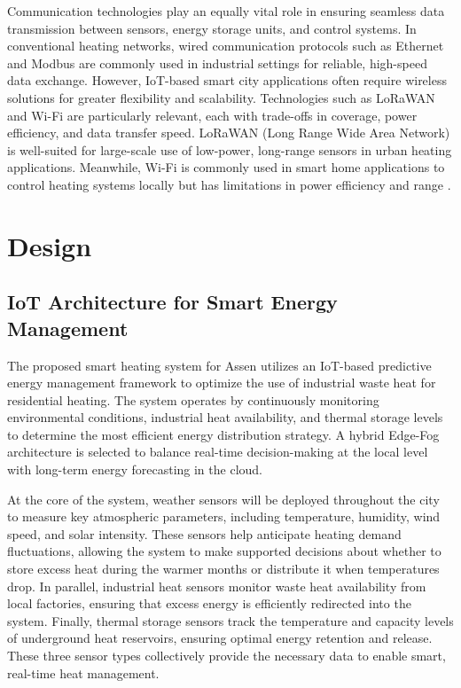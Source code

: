 \documentclass{article}
\begin{document}
Communication technologies play an equally vital role in ensuring seamless data transmission between sensors, energy storage units, and control systems. In conventional heating networks, wired communication protocols such as Ethernet and Modbus are commonly used in industrial settings for reliable, high-speed data exchange. However, IoT-based smart city applications often require wireless solutions for greater flexibility and scalability. Technologies such as LoRaWAN and Wi-Fi are particularly relevant, each with trade-offs in coverage, power efficiency, and data transfer speed. LoRaWAN (Long Range Wide Area Network) is well-suited for large-scale use of low-power, long-range sensors in urban heating applications. Meanwhile, Wi-Fi is commonly used in smart home applications to control heating systems locally but has limitations in power efficiency and range \cite{comm_tech_review}. 

\section{Design}

\subsection{IoT Architecture for Smart Energy Management}

The proposed smart heating system for Assen utilizes an IoT-based predictive energy management framework to optimize the use of industrial waste heat for residential heating. The system operates by continuously monitoring environmental conditions, industrial heat availability, and thermal storage levels to determine the most efficient energy distribution strategy. A hybrid Edge-Fog architecture is selected to balance real-time decision-making at the local level with long-term energy forecasting in the cloud.

At the core of the system, weather sensors will be deployed throughout the city to measure key atmospheric parameters, including temperature, humidity, wind speed, and solar intensity. These sensors help anticipate heating demand fluctuations, allowing the system to make supported decisions about whether to store excess heat during the warmer months or distribute it when temperatures drop. In parallel, industrial heat sensors monitor waste heat availability from local factories, ensuring that excess energy is efficiently redirected into the system. Finally, thermal storage sensors track the temperature and capacity levels of underground heat reservoirs, ensuring optimal energy retention and release. These three sensor types collectively provide the necessary data to enable smart, real-time heat management.
\end{document}
